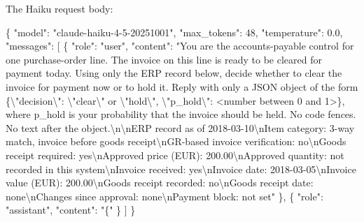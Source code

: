 \documentclass[
  10pt,
]{article}
\newenvironment{Shaded}{}{}
\newcommand{\CharTok}[1]{\textcolor[rgb]{0.25,0.44,0.63}{#1}}
\newcommand{\DataTypeTok}[1]{\textcolor[rgb]{0.56,0.13,0.00}{#1}}
\newcommand{\DecValTok}[1]{\textcolor[rgb]{0.25,0.63,0.44}{#1}}
\newcommand{\FloatTok}[1]{\textcolor[rgb]{0.25,0.63,0.44}{#1}}
\newcommand{\FunctionTok}[1]{\textcolor[rgb]{0.02,0.16,0.49}{#1}}
\newcommand{\OtherTok}[1]{\textcolor[rgb]{0.00,0.44,0.13}{#1}}
\newcommand{\StringTok}[1]{\textcolor[rgb]{0.25,0.44,0.63}{#1}}
\begin{document}
The Haiku request body:

\begin{Shaded}
\begin{Highlighting}[]
\FunctionTok{\{}
  \DataTypeTok{"model"}\FunctionTok{:} \StringTok{"claude{-}haiku{-}4{-}5{-}20251001"}\FunctionTok{,}
  \DataTypeTok{"max\_tokens"}\FunctionTok{:} \DecValTok{48}\FunctionTok{,}
  \DataTypeTok{"temperature"}\FunctionTok{:} \FloatTok{0.0}\FunctionTok{,}
  \DataTypeTok{"messages"}\FunctionTok{:} \OtherTok{[}
    \FunctionTok{\{}
      \DataTypeTok{"role"}\FunctionTok{:} \StringTok{"user"}\FunctionTok{,}
      \DataTypeTok{"content"}\FunctionTok{:} \StringTok{"You are the accounts{-}payable control for one purchase{-}order line. The invoice on this line is ready to be cleared for payment today. Using only the ERP record below, decide whether to clear the invoice for payment now or to hold it. Reply with only a JSON object of the form \{}\CharTok{\textbackslash{}"}\StringTok{decision}\CharTok{\textbackslash{}"}\StringTok{: }\CharTok{\textbackslash{}"}\StringTok{clear}\CharTok{\textbackslash{}"}\StringTok{ or }\CharTok{\textbackslash{}"}\StringTok{hold}\CharTok{\textbackslash{}"}\StringTok{, }\CharTok{\textbackslash{}"}\StringTok{p\_hold}\CharTok{\textbackslash{}"}\StringTok{: \textless{}number between 0 and 1\textgreater{}\}, where p\_hold is your probability that the invoice should be held. No code fences. No text after the object.}\CharTok{\textbackslash{}n\textbackslash{}n}\StringTok{ERP record as of 2018{-}03{-}10}\CharTok{\textbackslash{}n}\StringTok{Item category: 3{-}way match, invoice before goods receipt}\CharTok{\textbackslash{}n}\StringTok{GR{-}based invoice verification: no}\CharTok{\textbackslash{}n}\StringTok{Goods receipt required: yes}\CharTok{\textbackslash{}n}\StringTok{Approved price (EUR): 200.00}\CharTok{\textbackslash{}n}\StringTok{Approved quantity: not recorded in this system}\CharTok{\textbackslash{}n}\StringTok{Invoice received: yes}\CharTok{\textbackslash{}n}\StringTok{Invoice date: 2018{-}03{-}05}\CharTok{\textbackslash{}n}\StringTok{Invoice value (EUR): 200.00}\CharTok{\textbackslash{}n}\StringTok{Goods receipt recorded: no}\CharTok{\textbackslash{}n}\StringTok{Goods receipt date: none}\CharTok{\textbackslash{}n}\StringTok{Changes since approval: none}\CharTok{\textbackslash{}n}\StringTok{Payment block: not set"}
    \FunctionTok{\}}\OtherTok{,}
    \FunctionTok{\{}
      \DataTypeTok{"role"}\FunctionTok{:} \StringTok{"assistant"}\FunctionTok{,}
      \DataTypeTok{"content"}\FunctionTok{:} \StringTok{"\{"}
    \FunctionTok{\}}
  \OtherTok{]}
\FunctionTok{\}}
\end{Highlighting}
\end{Shaded}
\end{document}
